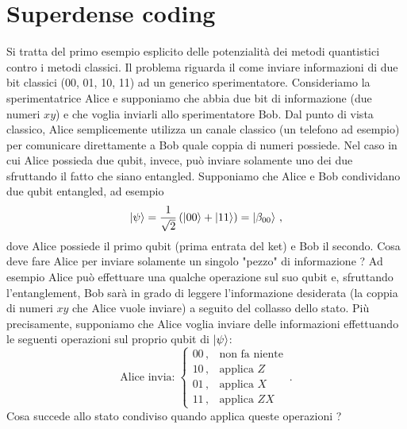 \section{Superdense coding}
Si tratta del primo esempio esplicito delle potenzialità dei metodi quantistici contro i metodi classici. Il problema riguarda il come inviare informazioni di due bit classici (00, 01, 10, 11) ad un generico sperimentatore. Consideriamo la sperimentatrice Alice e supponiamo che abbia due bit di informazione (due numeri $xy$) e che voglia inviarli allo sperimentatore Bob. Dal punto di vista classico, Alice semplicemente utilizza un canale classico (un telefono ad esempio) per comunicare direttamente a Bob quale coppia di numeri possiede. Nel caso in cui Alice possieda due qubit, invece, può inviare solamente uno dei due sfruttando il fatto che siano entangled. Supponiamo che Alice e Bob condividano due qubit entangled, ad esempio
\begin{equation*}
    \ket{\psi} = \frac{1}{\sqrt{2}} \left( \ket{00} + \ket{11} \right) = \ket{\beta_{00}} \, ,
\end{equation*}
dove Alice possiede il primo qubit (prima entrata del ket) e Bob il secondo. Cosa deve fare Alice per inviare solamente un singolo "pezzo" di informazione ? Ad esempio Alice può effettuare una qualche operazione sul suo qubit e, sfruttando l'entanglement, Bob sarà in grado di leggere l'informazione desiderata (la coppia di numeri $xy$ che Alice vuole inviare) a seguito del collasso dello stato. Più precisamente, supponiamo che Alice voglia inviare delle informazioni effettuando le seguenti operazioni sul proprio qubit di $\ket{\psi}$:
\begin{equation*}
    \text{Alice invia:} \; 
    \begin{cases}
        00 \, , &\text{non fa niente} \\
        10 \, , &\text{applica } Z \\
        01 \, , &\text{applica } X \\
        11 \, , &\text{applica } ZX
    \end{cases} \, .
\end{equation*}
Cosa succede allo stato condiviso quando applica queste operazioni ? 
